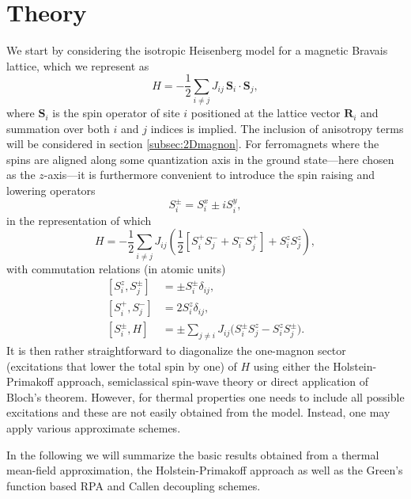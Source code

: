 \documentclass[aps,prb,reprint,floatfix,superscriptaddress]{revtex4-2}
\begin{document}
\section{Theory}\label{sec:theory}
We start by considering the isotropic Heisenberg model for a magnetic Bravais lattice, which we represent as
\begin{equation}\label{heisenbrghamiltonian}
    H = -\frac{1}{2}\sum_{i\neq j} J_{ij}\, \mathbf{S}_{i} \cdot \mathbf{S}_{j},
\end{equation}
where $\mathbf{S}_{i}$ is the spin operator of site $i$ positioned at the lattice vector $\mathbf{R}_i$ and summation over both $i$ and $j$ indices is implied. The inclusion of anisotropy terms will be considered in section \ref{subsec:2Dmagnon}. For ferromagnets where the spins are aligned along some quantization axis in the ground state---here chosen as the $z$-axis---it is furthermore convenient to introduce the spin raising and lowering operators
\begin{equation}
S^\pm_i=S_i^x \pm iS_i^y,
\end{equation}
in the representation of which
\begin{equation}
    H = - \frac{1}{2} \sum_{i\neq j} J_{ij} \left(\frac{1}{2}\left[S_i^+ S_j^- + S_i^- S_j^+\right] + S_i^z S_j^z\right),
    \label{eq:hamiltonian in circular coordinates}
\end{equation}
with commutation relations (in atomic units)
\begin{subequations}\label{spin-comm}
\begin{align}
[S_i^z,S_j^\pm] &= \pm S_i^\pm\delta_{ij}, \label{spin-comm-1}\\
[S_i^+,S_j^-] &= 2S_i^z\delta_{ij}, \label{spin-comm-2}\\
[S_i^\pm,H] &= \pm\sum_{j\neq i}J_{ij}\Big(S_i^\pm S_j^z-S_i^zS_j^\pm\Big). \label{spin-comm-H}
\end{align}
\end{subequations}
It is then rather straightforward to diagonalize the one-magnon sector (excitations that lower the total spin by one) of $H$ using either the Holstein-Primakoff approach, semiclassical spin-wave theory or direct application of Bloch's theorem. However, for thermal properties one needs to include all possible excitations and these are not easily obtained from the model. Instead, one may apply various approximate schemes.

In the following we will summarize the basic results obtained from a thermal mean-field approximation, the Holstein-Primakoff approach as well as the Green's function based RPA and Callen decoupling schemes.
\end{document}
